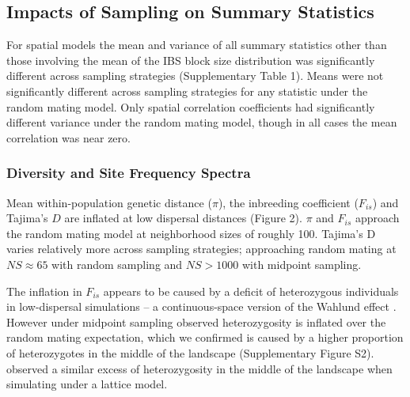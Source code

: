 \documentclass[9pt,twocolumn,twoside,lineno]{gsajnl}
\begin{document}

\subsection{Impacts of Sampling on Summary Statistics}
For spatial models the mean and variance of all summary statistics other than those involving the mean of the IBS block size distribution was significantly different across sampling strategies (Supplementary Table 1). Means were not significantly different across sampling strategies for any statistic under the random mating model. Only spatial correlation coefficients had significantly different variance under the random mating model, though in all cases the mean correlation was near zero.

\subsubsection{Diversity and Site Frequency Spectra}
Mean within-population genetic distance ($\pi$), the inbreeding coefficient ($F_{is}$) and Tajima's $D$ are inflated at low dispersal distances (Figure 2). $\pi$ and $F_{is}$ approach the random mating model at neighborhood sizes of roughly 100. Tajima's D varies relatively more across sampling strategies; approaching random mating at $NS\approx65$ with random sampling and $NS>1000$ with midpoint sampling.

The inflation in $F_{is}$ appears to be caused by a deficit of heterozygous individuals in low-dispersal simulations -- a continuous-space version of the Wahlund effect \citep{Wahlund1928}. However under midpoint sampling observed heterozygosity is inflated over the random mating expectation, which we confirmed is caused by a higher proportion of heterozygotes in the middle of the landscape (Supplementary Figure S2). \cite{Shirk2014} observed a similar excess of heterozygosity in the middle of the landscape when simulating under a lattice model. 
\end{document}
